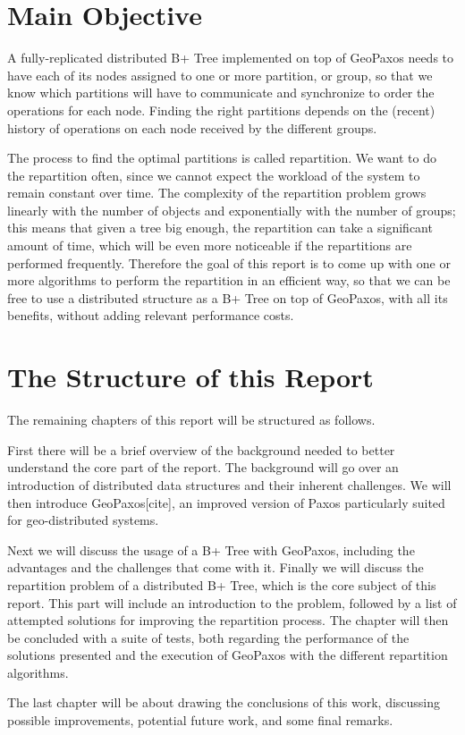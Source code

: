 \section{Main Objective}\label{sec:main-objective}
A fully-replicated distributed B+ Tree implemented on top of GeoPaxos needs to have each of its nodes assigned to one or more partition, or group, so that we know which partitions will have to communicate and synchronize to order the operations for each node. Finding the right partitions depends on the (recent) history of operations on each node received by the different groups.

The process to find the optimal partitions is called repartition. We want to do the repartition often, since we cannot expect the workload of the system to remain constant over time. The complexity of the repartition problem grows linearly with the number of objects and exponentially with the number of groups; this means that given a tree big enough, the repartition can take a significant amount of time, which will be even more noticeable if the repartitions are performed frequently. Therefore the goal of this report is to come up with one or more algorithms to perform the repartition in an efficient way, so that we can be free to use a distributed structure as a B+ Tree on top of GeoPaxos, with all its benefits, without adding relevant performance costs.

\section{The Structure of this Report}\label{the-structure-of-this-report}
The remaining chapters of this report will be structured as follows.

First there will be a brief overview of the background needed to better understand the core part of the report. The background will go over an introduction of distributed data structures and their inherent challenges. We will then introduce GeoPaxos[cite], an improved version of Paxos particularly suited for geo-distributed systems. 

Next we will discuss the usage of a B+ Tree with GeoPaxos, including the advantages and the challenges that come with it. Finally we will discuss the repartition problem of a distributed B+ Tree, which is the core subject of this report. This part will include an introduction to the problem, followed by a list of attempted solutions for improving the repartition process. The chapter will then be concluded with a suite of tests, both regarding the performance of the solutions presented and the execution of GeoPaxos with the different repartition algorithms.

The last chapter will be about drawing the conclusions of this work, discussing possible improvements, potential future work, and some final remarks.